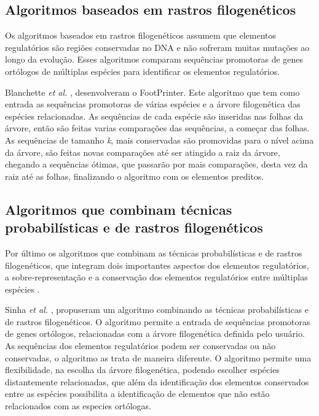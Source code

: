 \subsection{Algoritmos baseados em rastros filogenéticos}

Os algoritmos baseados em rastros filogenéticos assumem que elementos regulatórios são regiões conservadas no DNA e não sofreram muitas mutações ao longo da evolução. Esses algoritmos comparam sequências promotoras de genes ortólogos de múltiplas espécies para identificar os elementos regulatórios.

Blanchette \textit{et al.} \cite{Blanchette2002}, desenvolveram o FootPrinter. Este algoritmo que tem como entrada as sequências promotoras de várias espécies e a árvore filogenética das espécies relacionadas. As sequências de cada espécie são inseridas nas folhas da árvore, então são feitas varias comparações das sequências, a começar das folhas. As sequências de tamanho \textit{k}, mais conservadas são promovidas para o nível acima da árvore, são feitas novas comparações até ser atingido a raiz da árvore, chegando a sequências ótimas, que passarão por mais comparações, desta vez da raiz até as folhas, finalizando o algoritmo com os elementos preditos.

\subsection{Algoritmos que combinam técnicas probabilísticas e de rastros filogenéticos}

Por último os algoritmos que combinam as técnicas probabilísticas e de rastros filogenéticos, que integram dois importantes aspectos dos elementos regulatórios, a sobre-representação e a conservação dos elementos regulatórios entre múltiplas espécies \cite{Das2007}.

Sinha \textit{et al.} \cite{Sinha2004}, propuseram um algoritmo combinando as técnicas probabilísticas e de rastros filogenéticos. O algoritmo permite a entrada de sequências promotoras de genes ortólogos, relacionadas com a árvore filogenética definida pelo usuário. As sequências dos elementos regulatórios podem ser conservadas ou não conservadas, o algoritmo as trata de maneira diferente. O algoritmo permite uma flexibilidade, na escolha da árvore filogenética, podendo escolher espécies distantemente relacionadas, que além da identificação dos elementos conservados entre as espécies possibilita a identificação de elementos que não estão relacionados com as especies ortólogas.


